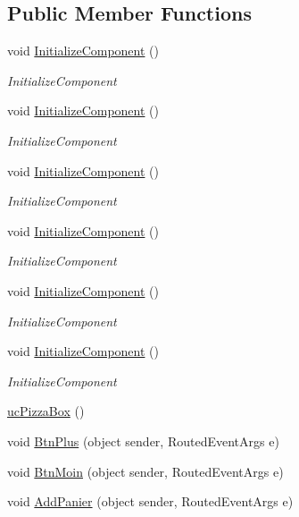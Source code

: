 \subsection*{Public Member Functions}
\begin{DoxyCompactItemize}
\item 
void \hyperlink{classnewPizza1_1_1ucPizzaBox_a0bf3486ff05489987fc9b6766aec72d1}{Initialize\+Component} ()
\begin{DoxyCompactList}\small\item\em Initialize\+Component \end{DoxyCompactList}\item 
void \hyperlink{classnewPizza1_1_1ucPizzaBox_a0bf3486ff05489987fc9b6766aec72d1}{Initialize\+Component} ()
\begin{DoxyCompactList}\small\item\em Initialize\+Component \end{DoxyCompactList}\item 
void \hyperlink{classnewPizza1_1_1ucPizzaBox_a0bf3486ff05489987fc9b6766aec72d1}{Initialize\+Component} ()
\begin{DoxyCompactList}\small\item\em Initialize\+Component \end{DoxyCompactList}\item 
void \hyperlink{classnewPizza1_1_1ucPizzaBox_a0bf3486ff05489987fc9b6766aec72d1}{Initialize\+Component} ()
\begin{DoxyCompactList}\small\item\em Initialize\+Component \end{DoxyCompactList}\item 
void \hyperlink{classnewPizza1_1_1ucPizzaBox_a0bf3486ff05489987fc9b6766aec72d1}{Initialize\+Component} ()
\begin{DoxyCompactList}\small\item\em Initialize\+Component \end{DoxyCompactList}\item 
void \hyperlink{classnewPizza1_1_1ucPizzaBox_a0bf3486ff05489987fc9b6766aec72d1}{Initialize\+Component} ()
\begin{DoxyCompactList}\small\item\em Initialize\+Component \end{DoxyCompactList}\item 
\hyperlink{classnewPizza1_1_1ucPizzaBox_a2065c5b42e15eb08893bfe6f4c234234}{uc\+Pizza\+Box} ()
\item 
void \hyperlink{classnewPizza1_1_1ucPizzaBox_aace7edb7bdff4d02a75836f8a7e80221}{Btn\+Plus} (object sender, Routed\+Event\+Args e)
\item 
void \hyperlink{classnewPizza1_1_1ucPizzaBox_ab1d98de6858b3645f59078f09749e86d}{Btn\+Moin} (object sender, Routed\+Event\+Args e)
\item 
void \hyperlink{classnewPizza1_1_1ucPizzaBox_a01dc4464850976521aa8c0bc7fff190a}{Add\+Panier} (object sender, Routed\+Event\+Args e)
\end{DoxyCompactItemize}
